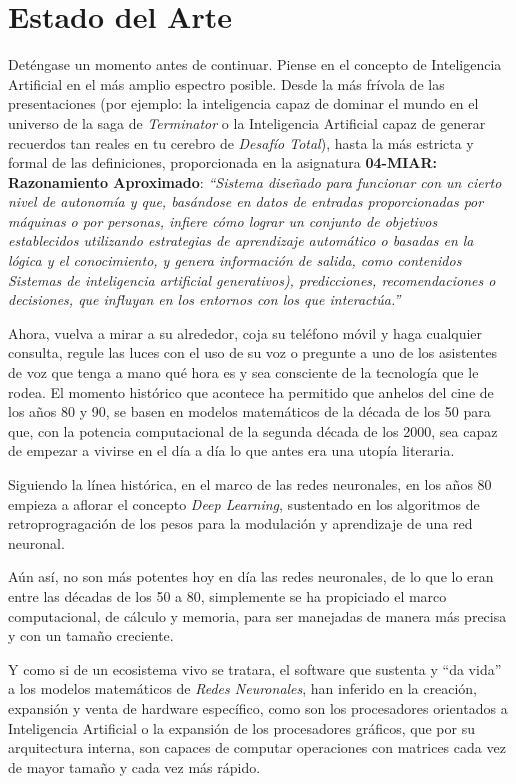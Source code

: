 
\cleardoublepage

\chapter{Estado del Arte}

Deténgase un momento antes de continuar. Piense en el concepto de Inteligencia Artificial en el más amplio espectro posible. Desde la más frívola de las presentaciones (por ejemplo: la inteligencia capaz de dominar el mundo en el universo de la saga de \emph{Terminator} o la Inteligencia Artificial capaz de generar recuerdos tan reales en tu cerebro de \emph{Desafío Total}), hasta la más estricta y formal de las definiciones, proporcionada en la asignatura \textbf{04-MIAR: Razonamiento Aproximado}:
\emph{``Sistema diseñado para funcionar con un cierto nivel de autonomía y que, basándose en datos de entradas proporcionadas por máquinas o por personas, infiere cómo lograr un conjunto de objetivos establecidos utilizando estrategias de aprendizaje automático o basadas en la lógica y el conocimiento, y genera información de salida, como contenidos Sistemas de inteligencia artificial generativos), predicciones, recomendaciones o decisiones, que influyan en los entornos con los que interactúa.''}

Ahora, vuelva a mirar a su alrededor, coja su teléfono móvil y haga cualquier consulta, regule las luces con el uso de su voz o pregunte a uno de los asistentes de voz que tenga a mano qué hora es y sea consciente de la tecnología que le rodea. El momento histórico que acontece ha permitido que anhelos del cine de los años 80 y 90, se basen en modelos matemáticos de la década de los 50 para que, con la potencia computacional de la segunda década de los 2000, sea capaz de empezar a vivirse en el día a día lo que antes era una utopía literaria.

Siguiendo la línea histórica, en el marco de las redes neuronales, en los años 80 empieza a aflorar el concepto \emph{Deep Learning}, sustentado en los algoritmos de retroprogragación de los pesos para la modulación y aprendizaje de una red neuronal.

Aún así, no son más potentes hoy en día las redes neuronales, de lo que lo eran entre las décadas de los 50 a 80, simplemente se ha propiciado el marco computacional, de cálculo y memoria, para ser manejadas de manera más precisa y con un tamaño creciente.

Y como si de un ecosistema vivo se tratara, el software que sustenta y ``da vida'' a los modelos matemáticos de \emph{Redes Neuronales}, han inferido en la creación, expansión y venta de hardware específico, como son los procesadores orientados a Inteligencia Artificial o la expansión de los procesadores gráficos, que por su arquitectura interna, son capaces de computar operaciones con matrices cada vez de mayor tamaño y cada vez más rápido.

